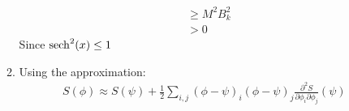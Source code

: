 \documentclass[12pt,a4]{article}
\begin{document}
\begin{enumerate}
\begin{enumerate}
\begin{align*}
                                                                  & \geq  M^2 B_{k}^2 \\
                                                                  & >  0 
        \end{align*}
        Since $\sech^2(x) \leq 1$
      \item
        Using the approximation:
        \begin{align*}
          S(\phi) \approx S(\psi) + \frac{1}{2}\sum_{i,j}(\phi - \psi)_i (\phi - \psi)_j \frac{\partial^2 S}{\partial \phi_i \partial \phi_j}(\psi)
        \end{align*}
    \end{enumerate}
\end{enumerate}
\end{document}
